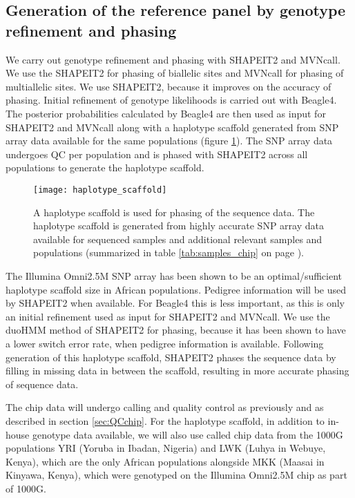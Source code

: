 \subsection{Generation of the reference panel by genotype refinement and phasing}
\label{sec:refine_and_phase}
We carry out genotype refinement and phasing with SHAPEIT2\cite{Delaneau2012} and MVNcall.\cite{Menelaou2013} We use the SHAPEIT2 for phasing of biallelic sites and MVNcall for phasing of multiallelic sites. We use SHAPEIT2, because it improves on the accuracy of phasing.\cite{2014Delaneau} Initial refinement of genotype likelihoods is carried out with Beagle4.\cite{Browning20071084} The posterior probabilities calculated by Beagle4 are then used as input for SHAPEIT2 and MVNcall along with a haplotype scaffold generated from SNP array data available for the same populations (figure \ref{fig:haplotype_scaffold}). The SNP array data undergoes QC per population and is phased with SHAPEIT2 across all populations to generate the haplotype scaffold.

\begin{figure}[!htbp]
\centering
\texttt{[image: haplotype\_scaffold]}
\caption{A haplotype scaffold is used for phasing of the sequence data. The haplotype scaffold is generated from highly accurate SNP array data available for sequenced samples and additional relevant samples and populations (summarized in table \ref{tab:samples_chip} on page \pageref{tab:samples_chip}).}
\label{fig:haplotype_scaffold}
\end{figure}

The Illumina Omni2.5M SNP array has been shown to be an optimal/sufficient haplotype scaffold size in African populations.\cite{Menelaou2013}\cite{2014Delaneau} Pedigree information will be used by SHAPEIT2 when available. For Beagle4 this is less important, as this is only an initial refinement used as input for SHAPEIT2 and MVNcall. We use the duoHMM method of SHAPEIT2 for phasing, because it has been shown to have a lower switch error rate, when pedigree information is available.\cite{OConnell2014} Following generation of this haplotype scaffold, SHAPEIT2 phases the sequence data by filling in missing data in between the scaffold, resulting in more accurate phasing of sequence data.

The chip data will undergo calling and quality control as previously\cite{Gurdasani2015} and as described in section \ref{sec:QCchip}. For the haplotype scaffold, in addition to in-house genotype data available, we will also use called chip data from the 1000G populations YRI (Yoruba in Ibadan, Nigeria) and LWK (Luhya in Webuye, Kenya), which are the only African populations alongside MKK (Maasai in Kinyawa, Kenya), which were genotyped on the Illumina Omni2.5M chip as part of 1000G.

